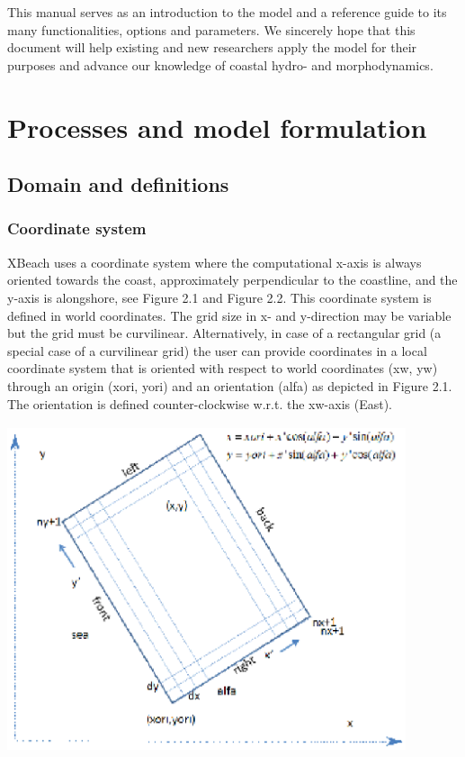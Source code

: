 \documentclass{article}
\begin{document}
\noindent 

\noindent This manual serves as an introduction to the model and a reference guide to its many functionalities, options and parameters. We sincerely hope that this document will help existing and new researchers apply the model for their purposes and advance our knowledge of coastal hydro- and morphodynamics.\eject 


\section{ Processes and model formulation}


\subsection{ Domain and definitions}


\subsubsection{ Coordinate system}

\noindent XBeach uses a coordinate system where the computational x-axis is always oriented towards the coast, approximately perpendicular to the coastline, and the y-axis is alongshore, see Figure 2.1 and Figure 2.2. This coordinate system is defined in world coordinates. The grid size in x- and y-direction may be variable but the grid must be curvilinear. Alternatively, in case of a rectangular grid (a special case of a curvilinear grid) the user can provide coordinates in a local coordinate system that is oriented with respect to world coordinates (xw, yw) through an origin (xori, yori) and an orientation (alfa) as depicted in Figure 2.1. The orientation is defined counter-clockwise w.r.t. the xw-axis (East). 

\noindent 

\noindent \includegraphics*[width=4.61in, height=3.78in, keepaspectratio=false, trim=2.05in 1.98in 0.00in 2.00in]{image8}
\end{document}
